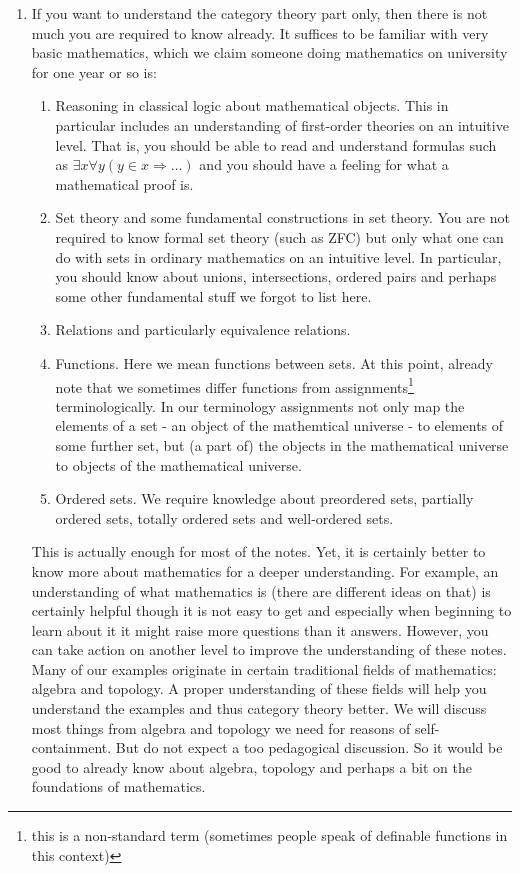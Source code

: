 \begin{enumerate}
\item[(1)]
If you want to understand the category theory part only, then there is not much you are required to know already. It suffices to be familiar with very basic mathematics, which we claim someone doing mathematics on university for one year or so is:
\begin{enumerate}
\item[$\bullet$]
Reasoning in classical logic about mathematical objects. This in particular includes an understanding of first-order theories on an intuitive level. That is, you should be able to read and understand formulas such as $\exists x \forall y(y \in x \Rightarrow \ldots)$ and you should have a feeling for what a mathematical proof is.
\item[$\bullet$]
Set theory and some fundamental constructions in set theory. You are not required to know formal set theory (such as ZFC) but only what one can do with sets in ordinary mathematics on an intuitive level. In particular, you should know about unions, intersections, ordered pairs and perhaps some other fundamental stuff we forgot to list here.
\item[$\bullet$]
Relations and particularly equivalence relations.
\item[$\bullet$]
Functions. Here we mean functions between sets. At this point, already note that we sometimes differ functions from {\glqq}assignments{\grqq}\footnote{this is a non-standard term (sometimes people speak of definable functions in this context)} terminologically. In our terminology assignments not only map the elements of a set - an object of the mathemtical universe - to elements of some further set, but (a part of) the objects in the mathematical universe to objects of the mathematical universe.
\item[$\bullet$]
Ordered sets. We require knowledge about preordered sets, partially ordered sets, totally ordered sets and well-ordered sets.
\end{enumerate}
This is actually enough for most of the notes. Yet, it is certainly better to know more about mathematics for a deeper understanding. For example, an understanding of what mathematics is (there are different ideas on that) is certainly helpful though it is not easy to get and especially when beginning to learn about it it might raise more questions than it answers. However, you can take action on another level to improve the understanding of these notes. Many of our examples originate in certain traditional fields of mathematics: algebra and topology. A proper understanding of these fields will help you understand the examples and thus category theory better. We will discuss most things from algebra and topology we need for reasons of self-containment. But do not expect a too pedagogical discussion. So it would be good to already know about algebra, topology and perhaps a bit on the foundations of mathematics.

\end{enumerate}
